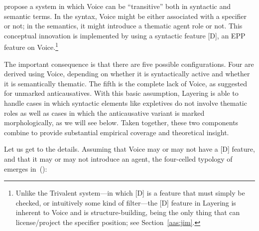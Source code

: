 \cite{layering15} propose a system in which Voice can be ``transitive'' both in syntactic and semantic terms. In the syntax, Voice might be either associated with a specifier or not; in the semantics, it might introduce a thematic agent role or not. This conceptual innovation is implemented by using a syntactic feature [D], an EPP feature on Voice.\footnote{Unlike the Trivalent system---in which [D] is a feature that must simply be checked, or intuitively some kind of filter---the [D] feature in Layering is inherent to Voice and is structure-building, being the only thing that can license/project the specifier position; see Section~\ref{aas:jim}.}

The important consequence is that there are five possible configurations. Four are derived using Voice, depending on whether it is syntactically active and whether it is semantically thematic. The fifth is the complete lack of Voice, as suggested for unmarked anticausatives. With this basic assumption, Layering is able to handle cases in which syntactic elements like expletives do not involve thematic roles as well as cases in which the anticausative variant is marked morphologically, as we will see below. Taken together, these two components combine to provide substantial empirical coverage and theoretical insight.

Let us get to the details. Assuming that Voice may or may not have a [D] feature, and that it may or may not introduce an agent, the four-celled typology of \citet[109]{layering15} emerges in~(\nextx):
\ex\label{ex:typo-layer}
\xe

